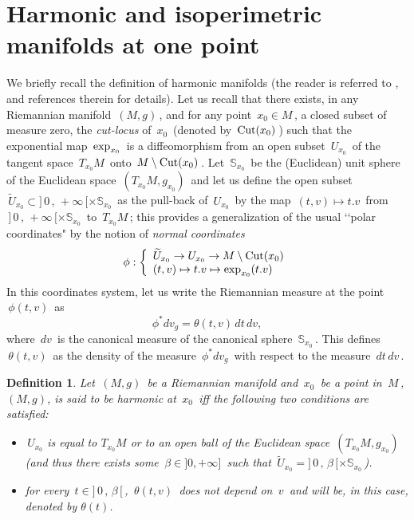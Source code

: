 \documentclass[11pt, reqno]{amsart}
\newtheorem{definition}[theoreme]{Definition}
\theoremstyle{plain}
\begin{document}
\section{Harmonic and isoperimetric manifolds at one point}
We briefly recall the definition of harmonic manifolds (the reader is referred to \cite{Be}, \cite{R-D} and references therein for details).
Let us recall that there exists, in any Riemannian manifold $\, (M,g)\,$, and for any point
$\,x_0 \in M\,$, a closed subset of measure zero, the {\em cut-locus}  of $\,x_0\,$ (denoted
by $\,{\rm Cut} (x_0)\,$) such that
the exponential map $\,{\rm exp}_{x_0}\,$ is a diffeomorphism from an open subset
$\, U_{x_0}\,$ of the tangent space $\,T_{x_0} M\,$ onto $\,M \setminus {\rm Cut} (x_0)\,$. 
Let $\,\mathbb S_{x_0}\,$ be the (Euclidean) unit sphere of the Euclidean space 
$\,\left(T_{x_0} M , g_{x_0}\right) \,$ and let us define the open subset 
$\,\widetilde U_{x_0} \subset ]\,0 \,,\,+ \infty\,[ \times \mathbb S_{x_0}\,$ 
as the pull-back of $\, U_{x_0}\,$ by the map $\, (t, v) \mapsto t.v\,$ from 
$\,]\,0 \,,\,+ \infty\,[ \times \mathbb S_{x_0}\,$ to $\,T_{x_0} M\,$; this provides a 
generalization of the usual \lq \lq polar coordinates" by the notion of  {\em normal coordinates} 
$$\phi : \left\{\begin{array}{l}
\widetilde U_{x_0} \to  U_{x_0} \to M \setminus {\rm Cut} (x_0)\\
(t, v) \mapsto t.v \mapsto {\rm exp}_{x_0} (t.v) \end{array}\right.$$
In this coordinates system, let us write the Riemannian measure at the point $\,\phi (t,v)\,$ as
\begin{equation}\label{theta}
\phi^* dv_g = \theta (t,v)\, dt\,dv,
\end{equation}
where $\,dv\,$ is the canonical measure of the canonical sphere $\,\mathbb S_{x_0}\,$.
This defines  $\,\theta (t,v)\,$ as the density of the measure $\, \phi^* dv_g \,$ with respect to
the measure $\, dt\,dv \,$.

\begin{definition}\label{harmonicpointe} 
Let $\, (M, g)\,$ be a Riemannian manifold and $\,x_0 \,$ be a point in $\,M\,$,
$(M,g)$, is said to be {\em harmonic at $\,x_0 \,$}  iff the following two conditions
are satisfied:
\begin{itemize}
\item $\, U_{x_0}$ is equal  to $T_{x_0}M$  or to an open   ball of the Euclidean space $\,\left(T_{x_0} M , g_{x_0}\right) \,$
{\rm (}and thus there exists some $\,\beta \in ] 0 , + \infty]\,$ such that 
$\,\widetilde U_{x_0} = ]\,0 \,,\,\beta\,[ \times \mathbb S_{x_0}\,${\rm )}. 

\item for every $\,t \in ]\,0 \,,\,\beta\,[\,$, $\,\theta (t,v)\,$ does not depend on $\,v\,$ and will be, in this case, denoted by $\theta(t)$.
\end{itemize}
\end{definition}
\end{document}
